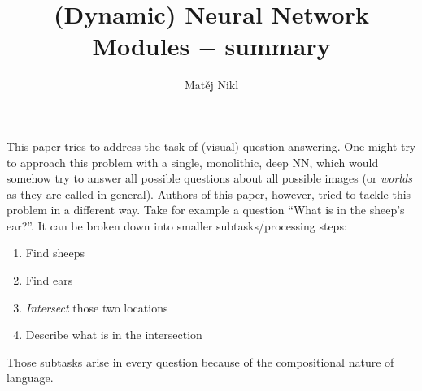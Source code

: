 \documentclass[a4paper,twocolumn]{article}
\title{(Dynamic) Neural Network Modules $-$ summary}
\author{Matěj Nikl}
\begin{document}
\maketitle
This paper tries to address the task of (visual) question answering. One might try to approach this problem with a single, monolithic, deep NN, which would somehow try to answer all possible questions about all possible images (or \textit{worlds} as they are called in general). Authors of this paper, however, tried to tackle this problem in a different way. Take for example a question ``What is in the sheep's ear?''. It can be broken down into smaller subtasks/processing steps:
    \begin{enumerate}
        \item Find sheeps
        \item Find ears
        \item \textit{Intersect} those two locations
        \item Describe what is in the intersection
    \end{enumerate}
Those subtasks arise in every question because of the compositional nature of language.
\end{document}
